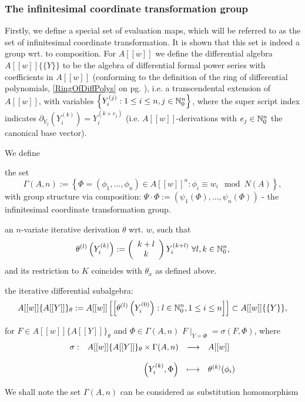 \subsubsection{The infinitesimal coordinate transformation group}
Firstly, we define a special set of evaluation maps, which will be referred to as the set of infinitesimal coordinate transformation. It is shown that this set is indeed a group wrt. to composition. For $A[[w]]$ we define the differential algebra $A[[w]]\{\{Y\}\}$ to be the algebra of differential formal power series with coefficients in $A[[w]]$ (conforming to the definition of the ring of differential polynomials, \ref{RingOfDiffPolys} on pg. \pageref{RingOfDiffPolys}), i.e. a transcendental extension of $A[[w]]$, with variables $\left\{Y_i^{(j)} : 1 \leq i \leq n, j \in \nz_0^n\right\}$, where the super script index indicates $\partial_{Y_j}\left(Y_i^{(k)}\right) = Y_i^{(k+e_j)}$ (i.e. $A[[w]]$-derivations with $e_j \in \nz_0^n$ the canonical base vector).
\begin{defi}
We define
\bn
\item the set $$\Gamma(A,n) := \left\{\Phi = (\phi_1,\ldots,\phi_n) \in A[[w]]^n : \phi_i \equiv w_i \mod N(A)\right\},$$
with group structure via composition: $\Psi \cdot \Phi := \left(\psi_1(\Phi),\ldots,\psi_n(\Phi)\right)$ - the infinitesimal coordinate transformation group.
\item an $n$-variate iterative derivation $\theta$ wrt. $w$, such that
$$\theta^{(l)}\left(Y_i^{(k)}\right) := \left(\bao{c}
k + l\\
k\\
\ea\right) Y_i^{(k+l)}\ \forall l, k \in \nz_0^n,$$
and its restriction to $K$ coincides with $\theta_x$ as defined above.
\item the iterative differential subalgebra: 
$$A[[w]]\{A[[Y]]\}_\theta := A[[w]]\left[\left[\theta^{(l)}\left(Y_i^{(0)}\right) : l \in \nz_0^n, 1 \le i \leq n\right]\right] \subset A[[w]]\{\{Y\}\},$$
\item for $F \in A[[w]]\{A[[Y]]\}_\theta$ and $\Phi \in \Gamma(A,n)$ $F\mid_{Y = \Phi} = \sigma(F,\Phi)$,  where
$$\bao{rrcl}
\sigma : &A[[w]]\{A[[Y]]\}_\theta \times \Gamma(A,n) &\longrightarrow &A[[w]]\\
&&&\\
&\left(Y_i^{(k)},\Phi\right)&\longmapsto&\theta^{(k)}(\phi_i)\\
\ea$$
\en
{}
\end{defi}
\bmk We shall note the set $\Gamma(A,n)$ can be considered as substitution homomorphism 
